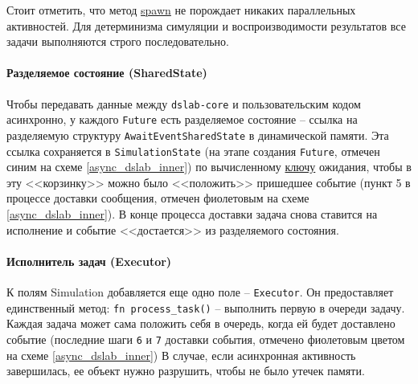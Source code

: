 Стоит отметить, что метод \hyperref[spawn]{spawn} не порождает никаких параллельных активностей. Для детерминизма симуляции и воспроизводимости результатов все задачи выполняются строго последовательно.



\paragraph{Разделяемое состояние (SharedState)}
Чтобы передавать данные между \texttt{dslab-core} и пользовательским кодом асинхронно, у каждого \texttt{Future} есть разделяемое состояние -- ссылка на разделяемую структуру \texttt{AwaitEventSharedState} в динамической памяти. Эта ссылка сохраняется в \texttt{SimulationState} (на этапе создания \texttt{Future}, отмечен синим на схеме \ref{async_dslab_inner}) по вычисленному \hyperref[awaitkey]{ключу} ожидания, чтобы в эту <<корзинку>> можно было <<положить>> пришедшее событие (пункт 5 в процессе доставки сообщения, отмечен фиолетовым на схеме \ref{async_dslab_inner}). В конце процесса  доставки задача снова ставится на исполнение и событие <<достается>> из разделяемого состояния. 

\paragraph{Исполнитель задач (Executor)}
К полям Simulation добавляется еще одно поле -- \texttt{Executor}. Он предоставляет единственный метод: \texttt{fn process\_task()} -- выполнить первую в очереди задачу. Каждая задача может сама положить себя в очередь, когда ей будет доставлено событие (последние шаги \texttt{6} и \texttt{7} доставки события, отмечено фиолетовым цветом на схеме \ref{async_dslab_inner}) В случае, если асинхронная активность завершилась, ее объект нужно разрушить, чтобы не было утечек памяти. 

